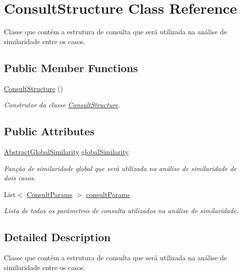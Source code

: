 \hypertarget{class_consult_structure}{}\section{Consult\+Structure Class Reference}
\label{class_consult_structure}


Classe que contém a estrutura de consulta que será utilizada na análise de similaridade entre os casos.  


\subsection*{Public Member Functions}
\begin{DoxyCompactItemize}
\item 
\hyperlink{class_consult_structure_a187faa0426546ce6251903a0064cf8a1}{Consult\+Structure} ()
\begin{DoxyCompactList}\small\item\em Construtor da classe \hyperlink{class_consult_structure}{Consult\+Structure}. \end{DoxyCompactList}\end{DoxyCompactItemize}
\subsection*{Public Attributes}
\begin{DoxyCompactItemize}
\item 
\hyperlink{class_abstract_global_similarity}{Abstract\+Global\+Similarity} \hyperlink{class_consult_structure_a337fe1e0d78aeb5e773f0bbeb5c9f5cc}{global\+Similarity}
\begin{DoxyCompactList}\small\item\em Função de similaridade global que será utilizada na análise de similaridade de dois casos. \end{DoxyCompactList}\item 
List$<$ \hyperlink{class_consult_params}{Consult\+Params} $>$ \hyperlink{class_consult_structure_a56fa08cf2668d390c41bb101d7fb9d40}{consult\+Params}
\begin{DoxyCompactList}\small\item\em Lista de todos os parâmetros de consulta utilizados na análise de similaridade. \end{DoxyCompactList}\end{DoxyCompactItemize}


\subsection{Detailed Description}
Classe que contém a estrutura de consulta que será utilizada na análise de similaridade entre os casos. 



